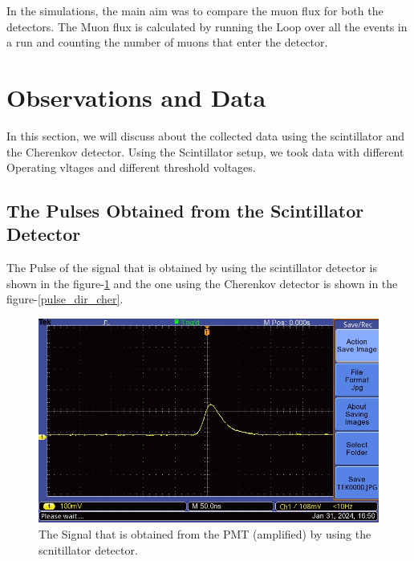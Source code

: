 \documentclass{article}
\begin{document}
\begin{multicols}{2}
In the simulations, the main aim was to compare the muon flux for both the detectors. 
The Muon flux is calculated by running the Loop over all the events in a run and counting the number of muons that enter the detector.

\section{\label{observations}Observations and Data}

In this section, we will discuss about the collected data using the scintillator and the Cherenkov detector. Using the Scintillator setup, we took data with different Operating vltages and different threshold voltages.


\subsection{The Pulses Obtained from the Scintillator Detector}

The Pulse of the signal that is obtained by using the scintillator detector is shown in the figure-\ref{pulse_dir_scint} and the one using the Cherenkov detector is shown in the figure-\ref{pulse_dir_cher}.
\begin{figure}[H]
    \centering
    \includegraphics[width = \columnwidth]{Images/Pulse_amp.JPG}
    \caption{The Signal that is obtained from the PMT (amplified) by using the scnitillator detector.}
    \label{pulse_dir_scint}
\end{figure}



\end{multicols}
\end{document}
